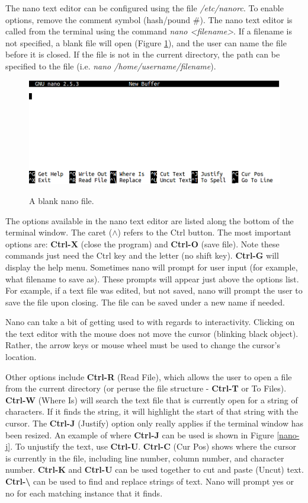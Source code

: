 \documentclass[12pt]{article}
\begin{document}
\quad The nano text editor can be configured using the file \textit{/etc/nanorc}. To enable options, remove the comment symbol (hash/pound \#). The nano text editor is called from the terminal using the command \textit{nano <filename>}. If a filename is not specified, a blank file will open (Figure \ref{nano-b}), and the user can name the file before it is closed. If the file is not in the current directory, the path can be specified to the file (i.e. \textit{nano /home/username/filename}).

\begin{figure}[H]
\centering
\caption{A blank nano file.}
\includegraphics[width=\textwidth]{nano-blank}
\label{nano-b}
\end{figure} 
\quad\enskip\quad The options available in the nano text editor are listed along the bottom of the terminal window. The caret ($\wedge$) refers to the Ctrl button. The most important options are: \textbf{Ctrl-X} (close the program) and \textbf{Ctrl-O} (save file). Note these commands just need the Ctrl key and the letter (no shift key). \textbf{Ctrl-G} will display the help menu. Sometimes nano will prompt for user input (for example, what filename to save as). These prompts will appear just above the options list. For example, if a text file was edited, but not saved, nano will prompt the user to save the file upon closing. The file can be saved under a new name if needed. 

\quad Nano can take a bit of getting used to with regards to interactivity. Clicking on the text editor with the mouse does not move the cursor (blinking black object). Rather, the arrow keys or mouse wheel must be used to change the cursor's location.

\quad Other options include \textbf{Ctrl-R} (Read File), which allows the user to open a file from the current directory (or peruse the file structure - \textbf{Ctrl-T} or To Files). \textbf{Ctrl-W} (Where Is) will search the text file that is currently open for a string of characters. If it finds the string, it will highlight the start of that string with the cursor. The \textbf{Ctrl-J} (Justify) option only really applies if the terminal window has been resized. An example of where \textbf{Ctrl-J} can be used is shown in Figure \ref{nano-j}. To unjustify the text, use \textbf{Ctrl-U}. \textbf{Ctrl-C} (Cur Pos) shows where the cursor is currently in the file, including line number, column number, and character number. \textbf{Ctrl-K} and \textbf{Ctrl-U} can be used together to cut and paste (Uncut) text. \textbf{Ctrl-\textbackslash} can be used to find and replace strings of text. Nano will prompt yes or no for each matching instance that it finds.
\end{document}
